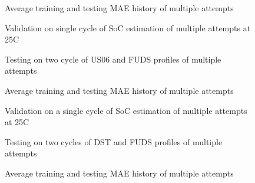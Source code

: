 \begin{figure*}[htbp]
    \centering
    \begin{subfigure}[b]{0.325\textwidth}
        \centering
        
        \caption{Average training and testing MAE history of multiple attempts}
    \end{subfigure}
    \hfill
    \begin{subfigure}[b]{0.325\textwidth}
        \centering
        
        \caption{Validation on single cycle of SoC estimation of multiple attempts at 25\textdegree{}C}
    \end{subfigure}
    \hfill
    \begin{subfigure}[b]{0.325\textwidth}
        \centering
        
        \caption{Testing on two cycle of US06 and FUDS profiles of multiple attempts}
        \label{subfig:Model-4res-DSTvsFUDS}
    \end{subfigure}
    \begin{subfigure}[b]{0.325\textwidth}
        \centering
        
        \caption{Average training and testing MAE history of multiple attempts}
    \end{subfigure}
    \hfill
    \begin{subfigure}[b]{0.325\textwidth}
        \centering
        
        \caption{Validation on a single cycle of SoC estimation of multiple attempts at 25\textdegree{}C}
    \end{subfigure}
    \hfill
    \begin{subfigure}[b]{0.325\textwidth}
        \centering
        
        \caption{Testing on two cycles of DST and FUDS profiles of multiple attempts}
    \end{subfigure}
    \begin{subfigure}[b]{0.325\textwidth}
        \centering
        
        \caption{Average training and testing MAE history of multiple attempts}

\end{subfigure}
\end{figure*}

